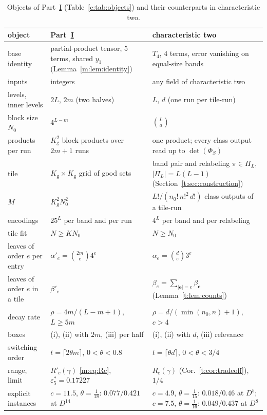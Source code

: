 \documentclass[11pt]{article}
\theoremstyle{definition}
\theoremstyle{remark}
\newcommand{\Nz}{N_0}
\newcommand{\Kg}{K_{\mathrm g}}
\newcommand{\es}{\varepsilon^*_5}
\begin{document}
\begin{table}[ht]
\centering\small
\renewcommand{\arraystretch}{1.12}\setlength{\tabcolsep}{4pt}
\begin{tabular}{@{}>{\raggedright}p{}>{\raggedright}p{}>{\raggedright\arraybackslash}p{}@{}}
object & Part~\hyperref[m:partI]{I} & characteristic two\\\hline
base identity & partial-product tensor, $5$ terms, shared $y_1$ (Lemma~\ref{m:lem:identity}) & $T_4$, $4$ terms, error vanishing on equal-size bands~\cite[Lemmas~2.1, 3.1]{Maj26b}\\
inputs & integers & any field of characteristic two\\
levels, inner levels & $2L$, $2m$ (two halves) & $L$, $d$ (one run per tile-run)\\
block size $\Nz$ & $4^{L-m}$ & $\binom La$\\
products per run & $\Kg^2$ block products over $2m+1$ runs & one product; every class output read up to $\det(\Phi_S)$~\cite[Prop.~3.2]{Maj26b}\\
tile & $\Kg\times\Kg$ grid of good sets & band pair and relabeling $\pi\in\Pi_L$, $|\Pi_L|=L(L-1)$ (Section~\ref{t:sec:construction})\\
$M$ & $\Kg^2\Nz^2$ & $L!/(n_0!\,n!^2\,d!)$ class outputs of a tile-run\\
encodings & $25^L$ per band and per run & $4^L$ per band and per relabeling\\
tile fit & $N\ge K\Nz$ & $N\ge\Nz$\\
leaves of order $e$ per entry & $\alpha'_e=\binom{2m}e4^e$ & $\alpha_e=\binom de3^e$\\
leaves of order $e$ in a tile & $\beta'_e$ & $\beta_e=\sum_{|\mathbf e|=e}\beta_{\mathbf e}$ (Lemma~\ref{t:lem:counts})\\
decay rate & $\rho=4m/(L-m+1)$, $L\ge5m$ & $\rho=d/(\min(n_0,n)+1)$, $c>4$\\
boxes & (i), (ii) with $2m$, (iii) per half & (i), (ii) with $d$, (iii) relevance\\
switching order & $t=\lceil2\theta m\rceil$, $0<\theta<0.8$ & $t=\lceil\theta d\rceil$, $0<\theta<3/4$\\
range, limit & $R'_c(\gamma)$ \eqref{m:eq:Rc}, $\es=0.17227$ & $R_c(\gamma)$ (Cor.~\ref{t:cor:tradeoff}), $1/4$\\
explicit instances & $c=11.5$, $\theta=\frac1{18}$: $0.077/0.421$ at $D^{14}$ & $c=4.9$, $\theta=\frac1{15}$: $0.018/0.46$ at $D^5$; $c=7.5$, $\theta=\frac1{16}$: $0.049/0.437$ at $D^8$
\end{tabular}
\caption{Objects of Part~\protect\hyperref[m:partI]{I} (Table~\ref{c:tab:objects}) and their counterparts in characteristic two.}
\label{t:tab:objects}
\end{table}
\end{document}
